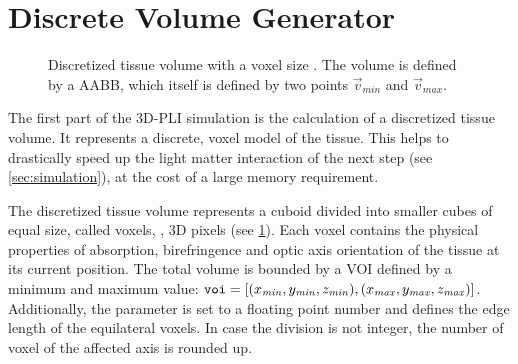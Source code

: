 \section{Discrete Volume Generator}
\label{sec:dv_generator}
%
\begin{figure}[!t]
\centering
\setlength{\tikzwidth}{0.5\textwidth}
\caption{Discretized tissue volume with a voxel size \voxelsize. The volume is defined by a \ac{AABB}, which itself is defined by two points $\vec{v}_\mathit{min}$ and $\vec{v}_\mathit{max}$.}
\label{fig:discVol}
\end{figure}
%
The first part of the \ac{3D-PLI} simulation is the calculation of a discretized tissue volume.
It represents a discrete, voxel model of the tissue.
This helps to drastically speed up the light matter interaction of the next step (see \cref{sec:simulation}), at the cost of a large memory requirement.
\par
%
The discretized tissue volume represents a cuboid divided into smaller cubes of equal size, called voxels, \ie{}, 3D pixels (see \cref{fig:discVol}).
Each voxel contains the physical properties of absorption, birefringence and optic axis orientation of the tissue at its current position.
The total volume is bounded by a \ac{VOI} defined by a minimum and maximum value: $\texttt{voi} = [(x_{\mathit{min}}, y_{\mathit{min}}, z_{\mathit{min}}), (x_{\mathit{max}}, y_{\mathit{max}}, z_{\mathit{max}})]$.
Additionally, the parameter \Voxelsize{} \voxelsize{} is set to a floating point number and defines the edge length of the equilateral voxels.
In case the division is not integer, the number of voxel of the affected axis is rounded up.
%
%
%
